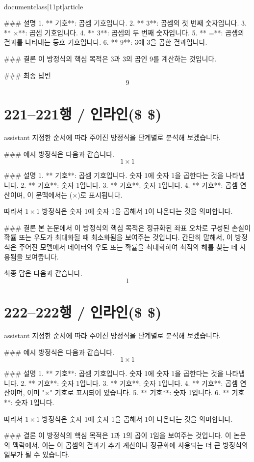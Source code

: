 \\documentclass[11pt]{article}
\begin{document}
### 설명
1. ** 기호**: 곱셈 기호입니다.
2. ** 3**: 곱셈의 첫 번째 숫자입니다.
3. ** ×**: 곱셈 기호입니다.
4. ** 3**: 곱셈의 두 번째 숫자입니다.
5. ** =**: 곱셈의 결과를 나타내는 등호 기호입니다.
6. ** 9**: 3에 3을 곱한 결과입니다.

### 결론
이 방정식의 핵심 목적은 3과 3의 곱인 9를 계산하는 것입니다.

### 최종 답변
\[
\boxed{9}
\]

\section*{221–221행 / 인라인(\$ \$) }
assistant
지정한 순서에 따라 주어진 방정식을 단계별로 분석해 보겠습니다.

### 예시
방정식은 다음과 같습니다.
\[ 1 \times 1 \]

### 설명
1. ** 기호**: 곱셈 기호입니다. 숫자 1에 숫자 1을 곱한다는 것을 나타냅니다.
2. ** 기호**: 숫자 1입니다.
3. ** 기호**: 숫자 1입니다.
4. ** 기호**: 곱셈 연산이며, 이 문맥에서는 (×)로 표시됩니다.

따라서 \(1 \times 1\) 방정식은 숫자 1에 숫자 1을 곱해서 1이 나온다는 것을 의미합니다.

### 결론
본 논문에서 이 방정식의 핵심 목적은 정규화된 좌표 오차로 구성된 손실이 확률 또는 우도가 최대화될 때 최소화됨을 보여주는 것입니다. 간단히 말해서, 이 방정식은 주어진 모델에서 데이터의 우도 또는 확률을 최대화하여 최적의 해를 찾는 데 사용됨을 보여줍니다.

최종 답은 다음과 같습니다.
\[
\boxed{1}
\]

\section*{222–222행 / 인라인(\$ \$) }
assistant
지정한 순서에 따라 주어진 방정식을 단계별로 분석해 보겠습니다.

### 예시
방정식은 다음과 같습니다.
\[ 1 \times 1 \]

### 설명
1. ** 기호**: 곱셈 기호입니다. 숫자 1에 숫자 1을 곱한다는 것을 나타냅니다.
2. ** 기호**: 숫자 1입니다.
3. ** 기호**: 숫자 1입니다.
4. ** 기호**: 곱셈 연산이며, 이미 "×" 기호로 표시되어 있습니다.
5. ** 기호**: 숫자 1입니다.
6. ** 기호**: 숫자 1입니다.

따라서 \( 1 \times 1 \) 방정식은 숫자 1에 숫자 1을 곱해서 1이 나온다는 것을 의미합니다.

### 결론
이 방정식의 핵심 목적은 1과 1의 곱이 1임을 보여주는 것입니다. 이 논문의 맥락에서, 이는 이 곱셈의 결과가 추가 계산이나 정규화에 사용되는 더 큰 방정식의 일부가 될 수 있습니다.
\end{document}
